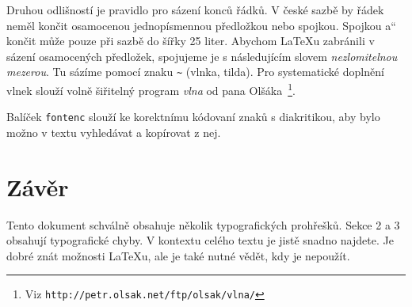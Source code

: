 \documentclass[a4paper,10pt,twocolumn]{article}
\newcommand{\uvozovky}[1]{\quotedblbase #1\textquotedblleft}
\begin{document}
Druhou odlišností je pravidlo pro sázení konců řádků. V české sazbě by řádek neměl končit osamocenou jednopísmennou předložkou nebo spojkou. Spojkou \uvozovky{a} končit může pouze při sazbě do šířky 25 liter. Abychom \LaTeX u zabránili v sázení osamocených předložek, spojujeme je s následujícím slovem \textit{nezlomitelnou mezerou}. Tu sázíme pomocí znaku \verb|~| (vlnka, tilda). Pro systematické doplnění vlnek slouží volně šiřitelný program \textit{vlna} od pana Olšáka~\footnote{Viz \texttt{http://petr.olsak.net/ftp/olsak/vlna/}}.

Balíček \texttt{fontenc} slouží ke korektnímu kódovaní znaků s diakritikou, aby bylo možno v textu vyhledávat a kopírovat z nej.

\section{Závěr}

Tento dokument schválně obsahuje několik typografických prohřešků. Sekce 2 a 3 obsahují typografické chyby. V kontextu celého textu je jistě snadno najdete. Je dobré znát možnosti \LaTeX u, ale je také nutné vědět, kdy je nepoužít.
\end{document}
